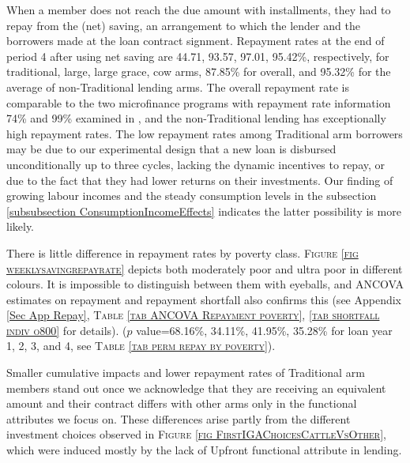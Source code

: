	When a member does not reach the due amount with installments, they had to repay from the (net) saving, an arrangement to which the lender and the borrowers made at the loan contract signment. Repayment rates at the end of period 4 after using net saving are 44.71, 93.57, 97.01, 95.42\%, respectively, for \textsf{traditional, large, large grace, cow} arms, 87.85\% for overall, and 95.32\% for the average of non-\textsf{Traditional} lending arms. %
	The overall repayment rate is comparable to the two microfinance programs with repayment rate information 74\% and 99\% examined in \citet{BanerjeeKarlanZinman2015}, and the non-\textsf{Traditional} lending has exceptionally high repayment rates. The low repayment rates among \textsf{Traditional} arm borrowers may be due to our experimental design that a new loan is disbursed unconditionally up to three cycles, lacking the dynamic incentives to repay, or due to the fact that they had lower returns on their investments. Our finding of growing labour incomes and the steady consumption levels in the subsection \ref{subsubsection ConsumptionIncomeEffects} indicates the latter possibility is more likely. 

	There is little difference in repayment rates by poverty class. \textsc{\footnotesize Figure \ref{fig weeklysavingrepayrate}} depicts both moderately poor and ultra poor in different colours. It is impossible to distinguish between them with eyeballs, and ANCOVA estimates on repayment and repayment shortfall also confirms this  (see Appendix \ref{Sec App Repay}, \textsc{\footnotesize Table \ref{tab ANCOVA Repayment poverty}, \ref{tab shortfall indiv o800}} for details).  ($p$ value=68.16\%, 34.11\%, 41.95\%, 35.28\% for loan year 1, 2, 3, and 4, see \textsc{\normalsize Table \ref{tab perm repay by poverty}}). 

	Smaller cumulative impacts and lower repayment rates of \textsf{Traditional} arm members stand out once we acknowledge that they are receiving an equivalent amount and their contract differs with other arms only in the functional attributes we focus on. These differences arise partly from the different investment choices observed in \textsc{\footnotesize Figure \ref{fig FirstIGAChoicesCattleVsOther}}, which were induced mostly by the lack of \textsf{Upfront} functional attribute in lending.
	
